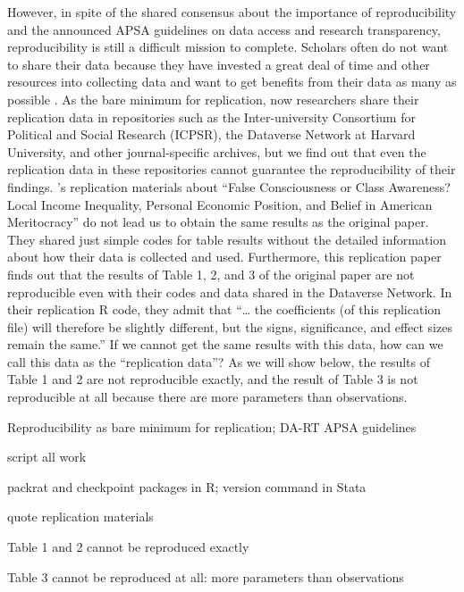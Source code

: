 However, in spite of the shared consensus about the importance of reproducibility and the announced APSA guidelines on data access and research transparency, reproducibility is still a difficult mission to complete. Scholars often do not want to share their data because they have invested a great deal of time and other resources into collecting data and want to get benefits from their data as many as possible \citep{Lupia and Alter2014}. As the bare minimum for replication, now researchers share their replication data in repositories such as the Inter-university Consortium for Political and Social Research (ICPSR), the Dataverse Network at Harvard University, and other journal-specific archives, but we find out that even the replication data in these repositories cannot guarantee the reproducibility of their findings. \citet{Newman, Johnston, and Lown2015a}’s replication materials about “False Consciousness or Class Awareness? Local Income Inequality, Personal Economic Position, and Belief in American Meritocracy” do not lead us to obtain the same results as the original paper. They shared just simple codes for table results without the detailed information about how their data is collected and used. Furthermore, this replication paper finds out that the results of Table 1, 2, and 3 of the original paper are not reproducible even with their codes and data shared in the Dataverse Network. In their replication R code, they admit that “… the coefficients (of this replication file) will therefore be slightly different, but the signs, significance, and effect sizes remain the same.” If we cannot get the same results with this data, how can we call this data as the “replication data”? As we will show below, the results of Table 1 and 2 are not reproducible exactly, and the result of Table 3 is not reproducible at all because there are more parameters than observations. 


Reproducibility as bare minimum for replication; DA-RT APSA guidelines

script all work

packrat and checkpoint packages in R; version command in Stata

quote \citet{Newman2015} replication materials

Table 1 and 2 cannot be reproduced exactly

Table 3 cannot be reproduced at all: more parameters than observations

